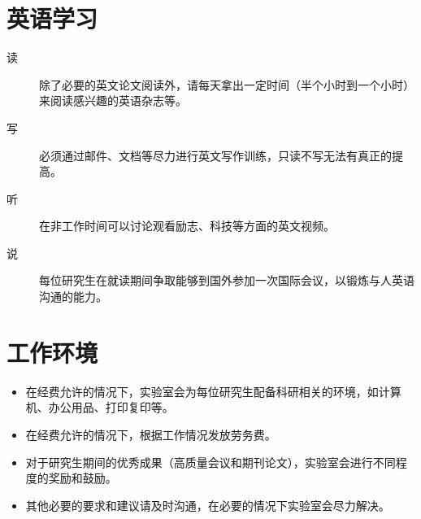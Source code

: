 \documentclass[a4paper，12pt]{article}
\begin{document}
\section{英语学习}

\begin{description}
\item[读] 除了必要的英文论文阅读外，请每天拿出一定时间（半个小时到一个小时）来阅读感兴趣的英语杂志等。
\item[写] 必须通过邮件、文档等尽力进行英文写作训练，只读不写无法有真正的提高。
\item[听] 在非工作时间可以讨论观看励志、科技等方面的英文视频。
\item[说] 每位研究生在就读期间争取能够到国外参加一次国际会议，以锻炼与人英语沟通的能力。
\end{description}

\section{工作环境}

\begin{itemize}
\item 在经费允许的情况下，实验室会为每位研究生配备科研相关的环境，如计算机、办公用品、打印复印等。
\item 在经费允许的情况下，根据工作情况发放劳务费。
\item 对于研究生期间的优秀成果（高质量会议和期刊论文），实验室会进行不同程度的奖励和鼓励。
\item 其他必要的要求和建议请及时沟通，在必要的情况下实验室会尽力解决。
\end{itemize}
\end{document}
